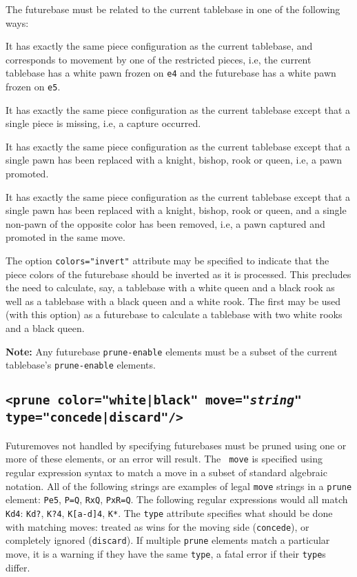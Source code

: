 \documentclass[11pt]{article}
\begin{document}
The futurebase must be related to the current tablebase in one of the
following ways:

\begin{description}
\item It has exactly the same piece configuration as the
current tablebase, and corresponds to movement by one of the
restricted pieces, i.e, the current tablebase has a white pawn frozen
on {\tt e4} and the futurebase has a white pawn frozen on {\tt e5}.

\item It has exactly the same piece configuration as
the current tablebase except that a single piece is missing, i.e,
a capture occurred.

\item It has exactly the same piece configuration as the current
tablebase except that a single pawn has been replaced with a knight,
bishop, rook or queen, i.e, a pawn promoted.

\item It has exactly the same piece configuration as the current
tablebase except that a single pawn has been replaced with a knight,
bishop, rook or queen, and a single non-pawn of the opposite color has
been removed, i.e, a pawn captured and promoted in the same move.

\end{description}

The option {\tt colors="invert"} attribute may be specified to indicate
that the piece colors of the futurebase should be inverted as it is
processed.  This precludes the need to calculate, say, a tablebase
with a white queen and a black rook as well as a tablebase with a
black queen and a white rook.  The first may be used (with this
option) as a futurebase to calculate a tablebase with two white rooks
and a black queen.

{\bf Note:} Any futurebase {\tt prune-enable} elements must be a subset of
the current tablebase's {\tt prune-enable} elements.

\subsection{\tt <prune color="white|black" move="{\it string}" type="concede|discard"/>}

Futuremoves not handled by specifying futurebases must be pruned using
one or more of these elements, or an error will result.  The {\tt
  move} is specified using regular expression syntax to match a move
in a subset of standard algebraic notation.  All of the following
strings are examples of legal {\tt move} strings in a {\tt prune}
element: {\tt Pe5}, {\tt P=Q}, {\tt RxQ}, {\tt PxR=Q}.  The following
regular expressions would all match {\tt Kd4}: {\tt Kd?}, {\tt K?4},
{\tt K[a-d]4}, {\tt K*}.  The {\tt type} attribute specifies what
should be done with matching moves: treated as wins for the moving
side ({\tt concede}), or completely ignored ({\tt discard}).  If
multiple {\tt prune} elements match a particular move, it is a warning
if they have the same {\tt type}, a fatal error if their {\tt type}s
differ.
\end{document}
